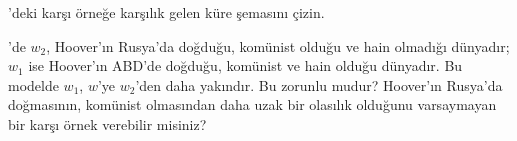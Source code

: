 \begin{prob}
'deki karşı örneğe karşılık gelen
küre şemasını çizin.
\end{prob}

\begin{prob}
  'de $w_2$, Hoover'ın Rusya'da
  doğduğu, komünist olduğu ve hain olmadığı dünyadır; $w_1$ ise Hoover'ın
  ABD'de doğduğu, komünist ve hain olduğu dünyadır. Bu modelde $w_1$, $w$'ye
  $w_2$'den daha yakındır. Bu zorunlu mudur? Hoover'ın Rusya'da doğmasının,
  komünist olmasından daha uzak bir olasılık olduğunu varsaymayan bir karşı
  örnek verebilir misiniz?
\end{prob}


